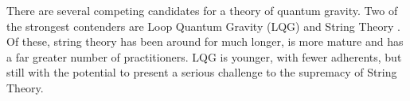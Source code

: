 \documentclass[a4paper]{article}
\begin{document}
\begin{comment}
Its a truth universally acknowledged, that in order to go \emph{beyond spacetime} one needs a consistent, complete theory of quantum gravity. Two of the strongest contenders for this crown are Loop Quantum Gravity (LQG) \cite{Ashtekar1991Lectures, Rovelli2011Zakopane, Ashtekar2004Background} and String Theory \cite{Tong2010Lectures,Zwiebach2009A-First,Polchinski1998aString}. Of these, string theory has been around for much longer, is more mature and has a far greater fan following. LQG is like David to string theory's Goliath: younger, smaller in stature but with the potential to unseat the presumed champion.

Seen from within the heart of each respective side's territory, the other side appears to be deeply flawed, riddled with inconsistencies and ultimately doomed to fail. For instance in \cite[Sec. 4, pg 6]{t-Hooft2016Natures}, 't Hooft refers to the related approaches of causal sets, causal dynamical triangulations and LQG, as ``\emph{completely wild concoctions that serious researchers have come up with}'' and describes them as the product of ``\emph{phantasy}''. From the LQG side, Lee Smolin has this to say in his book length critique of string theory \cite{Smolin2006The-trouble}: \emph{some string theorists prefer to believe that string theory is too arcane to be understood by human beings, rather than consider the possibility that it might just be wrong.} Clearly, the practitioners of both LQG and string theory have deeply held beliefs and strong feelings about any potential trespassers on their respective intellectual territory.

However, seen from the viewpoint of a neutral and, hopefully to some degree objective observer, this is not the life or death feud as it is made out to be by some, but rather simply a disagreement between two groups who, without realizing it, have been following different paths which lead to the same ultimate destination. Indeed the similarities between LQG and string theory are far too many to be mere coincidence. The following observations hold true for both fields:
\end{comment}

There are several competing candidates for a theory of quantum gravity. Two of the strongest contenders are Loop Quantum Gravity (LQG) \cite{Ashtekar1991Lectures, Rovelli2011Zakopane, Ashtekar2004Background} and String Theory \cite{Tong2010Lectures,Zwiebach2009A-First,Polchinski1998aString}. Of these, string theory has been around for much longer, is more mature and has a far greater number of practitioners. LQG is younger, with fewer adherents, but still with the potential to present a serious challenge to the supremacy of String Theory.
\end{document}
